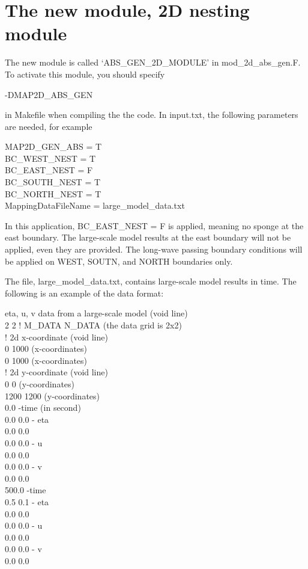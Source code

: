 \documentclass[preprint,10pt]{elsarticle}
\begin{document}
\section{The new module, 2D nesting module}
   
 The new module is called  `ABS\_GEN\_2D\_MODULE' in mod\_2d\_abs\_gen.F. To activate this module, you should specify 
 
  -DMAP2D\_ABS\_GEN
  
  in Makefile when compiling the the code. In input.txt, the following parameters are needed, for example
  
 \noindent 
MAP2D\_GEN\_ABS = T \\
BC\_WEST\_NEST = T \\
BC\_EAST\_NEST = F \\
BC\_SOUTH\_NEST = T  \\
BC\_NORTH\_NEST = T  \\
MappingDataFileName = large\_model\_data.txt   
 
In this application,  BC\_EAST\_NEST = F is applied, meaning no sponge at the east boundary.  The large-scale model results at the east boundary will not be applied, even they are provided. The long-wave passing boundary conditions will be applied on WEST, SOUTN, and NORTH boundaries only. 

The file, large\_model\_data.txt, contains large-scale model results in time. The following is an example of the data format:

\vspace{0.5cm}
\noindent
eta, u, v data from a large-scale model (void line) \\
2 2 ! M\_DATA N\_DATA (the data grid is 2x2) \\
! 2d x-coordinate (void line) \\
0 1000  (x-coordinates)\\
0 1000  (x-coordinates)\\
! 2d y-coordinate (void line)\\
0 0  (y-coordinates)\\
1200 1200 (y-coordinates) \\
0.0   -time (in second) \\
0.0 0.0 - eta \\
0.0 0.0 \\
0.0 0.0  - u \\
0.0 0.0 \\
0.0  0.0 - v \\
0.0 0.0  \\
500.0   -time \\
0.5 0.1 - eta \\
0.0 0.0 \\
0.0 0.0  - u \\
0.0 0.0 \\
0.0 0.0 - v \\
0.0 0.0  
\end{document}
